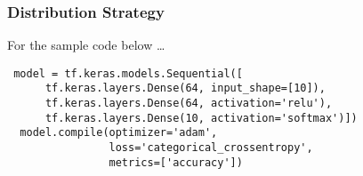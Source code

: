 





\begin{frame}[fragile] \frametitle{Distribution Strategy}

For the sample code below \ldots
\begin{lstlisting}
 model = tf.keras.models.Sequential([
      tf.keras.layers.Dense(64, input_shape=[10]),
      tf.keras.layers.Dense(64, activation='relu'),
      tf.keras.layers.Dense(10, activation='softmax')])
  model.compile(optimizer='adam',
                loss='categorical_crossentropy',
                metrics=['accuracy'])
\end{lstlisting}
\end{frame}

